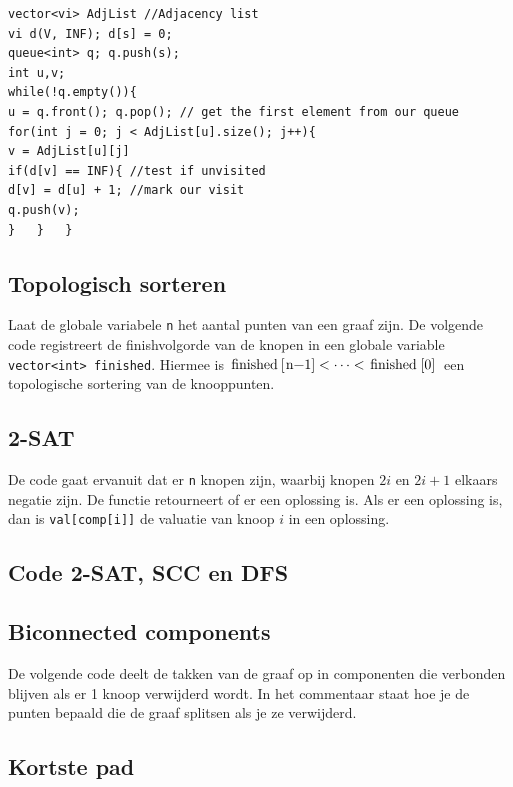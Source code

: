 \documentclass[10pt,a4paper,titlepage]{article}
\begin{document}
\begin{lstlisting}
vector<vi> AdjList //Adjacency list
vi d(V, INF); d[s] = 0;
queue<int> q; q.push(s);
int u,v;
while(!q.empty()){
u = q.front(); q.pop(); // get the first element from our queue
for(int j = 0; j < AdjList[u].size(); j++){
v = AdjList[u][j]
if(d[v] == INF){ //test if unvisited
d[v] = d[u] + 1; //mark our visit
q.push(v);
}	}	}
\end{lstlisting}


\subsection{Topologisch sorteren}

Laat de globale variabele \texttt{n} het aantal punten van een graaf zijn.
De volgende code registreert de finishvolgorde van de knopen in een globale variable \lstinline{vector<int> finished}. Hiermee is $\text{\lstinline{finished[n-1]}} < \cdots < \text{\lstinline{finished[0]}}$ een topologische sortering van de knooppunten.

\subsection{2-SAT}

De code gaat ervanuit dat er \lstinline{n} knopen zijn, waarbij knopen $2i$ en $2i+1$ elkaars negatie zijn. De functie retourneert of er een oplossing is. Als er een oplossing is, dan is \lstinline{val[comp[i]]} de valuatie van knoop $i$ in een oplossing.

\subsection{Code 2-SAT, SCC en DFS}







\subsection{Biconnected components}

De volgende code deelt de takken van de graaf op in componenten die verbonden blijven als er 1 knoop verwijderd wordt. In het commentaar staat hoe je de punten bepaald die de graaf splitsen als je ze verwijderd.



\subsection{Kortste pad}
\end{document}
